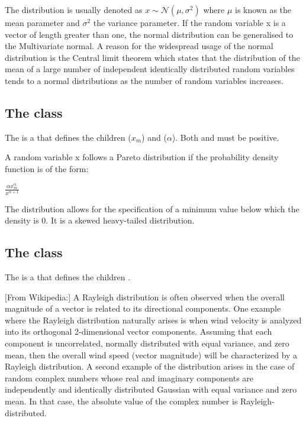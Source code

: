 The distribution is usually denoted as $x\sim \mathcal{N}(\mu,\sigma^2)$ where $\mu$ is known as the mean parameter and $\sigma^2$ the variance parameter. If the random variable x is a vector of length greater than one, the normal distribution can be generalised to the Multivariate normal.  A reason for the widespread usage of the normal distribution is the Central limit theorem which states that the distribution of the mean of a large number of independent identically distributed random variables tends to a normal distributions as the number of random variables increases.

\subsection{The  class}
\label{ParetoDistribution-class}
\label{paretodistribution-class}

The \ParetoDistribution is a \ContinuousUnivariateDistribution that defines the \UncertValue children  ($x_m$) and  ($\alpha$).  Both  and  must be positive.

A random variable x follows a Pareto distribution if the probability density function is of the form:

\begin{center}
$\frac{\alpha x_m^\alpha}{x^{\alpha+1}}$
\end{center}

The distribution allows for the specification of a minimum value below which the density is 0. It is a skewed heavy-tailed distribution.

\subsection{The  class}
\label{RayleighDistribution-class}
\label{rayleighdistribution-class}

The \RayleighDistribution is a \ContinuousUnivariateDistribution that defines the \UncertValue children .

[From Wikipedia:] A Rayleigh distribution is often observed when the overall magnitude of a vector is related to its directional components. One example where the Rayleigh distribution naturally arises is when wind velocity is analyzed into its orthogonal 2-dimensional vector components. Assuming that each component is uncorrelated, normally distributed with equal variance, and zero mean, then the overall wind speed (vector magnitude) will be characterized by a Rayleigh distribution. A second example of the distribution arises in the case of random complex numbers whose real and imaginary components are independently and identically distributed Gaussian with equal variance and zero mean. In that case, the absolute value of the complex number is Rayleigh-distributed.


